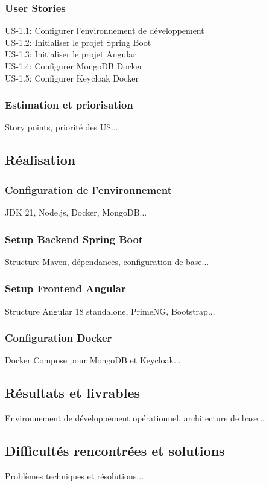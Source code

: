 \documentclass[12pt,a4paper]{report}
\begin{document}
\subsubsection{User Stories}
US-1.1: Configurer l'environnement de développement \\
US-1.2: Initialiser le projet Spring Boot \\
US-1.3: Initialiser le projet Angular \\
US-1.4: Configurer MongoDB Docker \\
US-1.5: Configurer Keycloak Docker

\subsubsection{Estimation et priorisation}
Story points, priorité des US...

\subsection{Réalisation}
\subsubsection{Configuration de l'environnement}
JDK 21, Node.js, Docker, MongoDB...

\subsubsection{Setup Backend Spring Boot}
Structure Maven, dépendances, configuration de base...

\subsubsection{Setup Frontend Angular}
Structure Angular 18 standalone, PrimeNG, Bootstrap...

\subsubsection{Configuration Docker}
Docker Compose pour MongoDB et Keycloak...

\subsection{Résultats et livrables}
Environnement de développement opérationnel, architecture de base...

\subsection{Difficultés rencontrées et solutions}
Problèmes techniques et résolutions...
\end{document}
